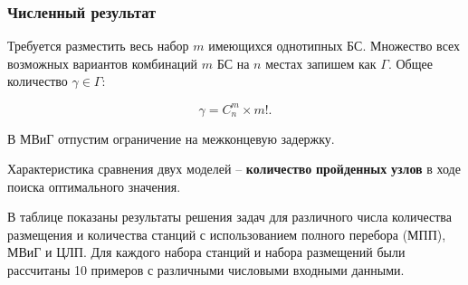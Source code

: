 \begin{frame}
    \frametitle{Численный результат}

    Требуется разместить весь набор $m$ имеющихся однотипных БС. Множество всех возможных вариантов комбинаций $m$ БС на  $n$ местах запишем как $\Gamma$. Общее количество $\gamma \in \Gamma$:
   
    \begin{displaymath}
    \gamma = C_n^m \times m!.
    \end{displaymath} 

    В МВиГ отпустим ограничение на межконцевую задержку.
    
    \bigskip

    Характеристика сравнения двух моделей --  \textbf{количество}  \textbf{пройденных}  \textbf{узлов} в ходе поиска оптимального значения.
    
    \bigskip
    В таблице показаны результаты решения задач для различного числа количества размещения и количества станций с использованием полного перебора (МПП), МВиГ и ЦЛП. Для каждого набора станций и набора размещений были рассчитаны 10 примеров с различными числовыми входными данными. 



\end{frame}

